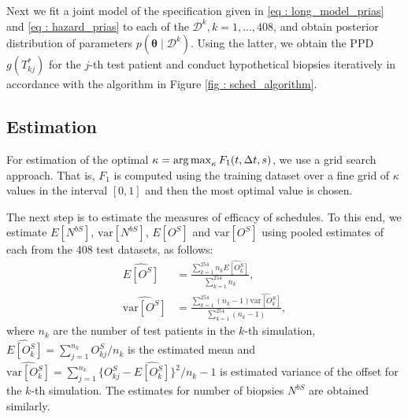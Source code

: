 Next we fit a joint model of the specification given in \ref{eq : long_model_prias} and \ref{eq : hazard_prias} to each of the $\mathcal{D}^k, k=1,
\ldots, 408$, and obtain posterior distribution of parameters $p(\boldsymbol{\theta} \mid \mathcal{D}^k)$. Using the latter, we obtain the PPD $g(T^*_{kj})$ for the $j$-th test patient and conduct hypothetical biopsies iteratively in accordance with the algorithm in Figure \ref{fig : sched_algorithm}. 

\subsection{Estimation}
For estimation of the optimal $\kappa = \operatorname{arg\,max}_{\kappa} F_1(t, \Delta t, s)$, we use a grid search approach. That is, $F_1$ is computed using the training dataset over a fine grid of $\kappa$ values in the interval $[0,1]$  and then the most optimal value is chosen.

The next step is to estimate the measures of efficacy of schedules. To this end, we estimate $E[N^{bS}]$, $\mbox{var}[N^{bS}]$, $E[O^S]$ and $\mbox{var}[O^S]$ using pooled estimates of each from the 408 test datasets, as follows:
\begin{align*}
\widehat{E[O^S]} &= \frac{\sum_{k=1}^{254} n_k \widehat{E[O^S_k]}}{\sum_{k=1}^{254} n_k}, \\
\widehat{\mbox{var}[O^S]} &= \frac{\sum_{k=1}^{254} (n_k - 1) \widehat{\mbox{var}[O^S_k]}}{\sum_{k=1}^{254} (n_k-1)}, 
\end{align*}
where $n_k$ are the number of test patients in the $k$-th simulation, $\widehat{E[O^S_k]} = {\sum_{j=1}^{n_k}O^S_{kj}}/{n_k}$ is the estimated mean and $\widehat{\mbox{var}[O^S_k]} = {\sum_{j=1}^{n_k}\big\{O^S_{kj} - \widehat{E[O^S_k]}\big\}^2}/{n_k-1}$ is estimated variance of the offset for the $k$-th simulation. The estimates for number of biopsies $N^{bS}$ are obtained similarly.

